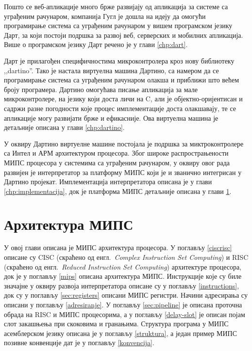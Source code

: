 \documentclass[12pt,oneside]{memoir}
\begin{document}
Пошто се веб-апликације много брже развијају од апликација за системе са уграђеним рачунаром, компанија Гугл је дошла на идеју да омогући програмирање система са уграђеним рачунаром у вишем програмском језику Дарт, за који постоји подршка за развој веб, серверских и мобилних апликација. Више о програмском језику Дарт речено је у глави \ref{chp:dart}.

Дарт је прилагођен специфичностима микроконтролера кроз нову библиотеку ,,dartino''. Тако је настала виртуелна машина Дартино, са намером да се програмирање система са уграђеним рачунаром олакша и приближи што већем броју програмера. Дартино омогућава писање апликација за мале микроконтролере, на језику који доста личи на C, али је објектно-оријентисан и садржи разне погодности које процес имплементације доста олакшавају, те се апликације могу развијати брже и ефикасније. Ова виртуелна машина је детаљније описана у глави \ref{chp:dartino}.

У оквиру Дартино виртуелне машине постојала је подршка за миктроконтролере са Интел и АРМ архитектуром процесора. Због широке распрострањености МИПС процесора у системима са уграђеним рачунаром, у оквиру овог рада развијен је интерпретатор за платформу МИПС који је и званично интегрисан у Дартино пројекат. Имплементација интерпретатора описана је у глави \ref{chp:implementacija}, док је платформа МИПС детаљније описана у глави \ref{chp:mips}.




\chapter{Архитектура МИПС}
\label{chp:mips}
У овој глави описана је МИПС архитектура процесора. У поглављу \ref{ciscrisc} описане су CISC (скраћено од енгл.~\textit{Complex Instruction Set Computing}) и RISC (скраћено од енгл.~\textit{Reduced Instruction Set Computing}) архитектуре процесора, док је у поглављу \ref{mips} описана архитектура МИПС. Инструкције које су биле значајне у оквиру развоја интерпретатора описане су у поглављу \ref{instructions}, док су у поглављу \ref{sec:registers} описани МИПС регистри. Начини адресирања су описани у поглављу \ref{adresiranje}. У поглављу \ref{sec:pipeline} је описана проточна обрада на RISC и МИПС процесорима, а у поглављу \ref{delay-slot} је описан појам слот закашњења при скоковима и гранањима.  Структура програма у МИПС асемблерском језику описана је у поглављу \ref{struktura}, а један пример МИПС позивне конвенције дат је у поглављу \ref{konvencija}.
\end{document}
